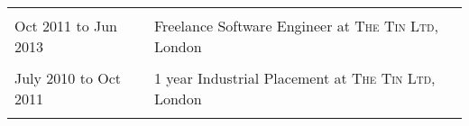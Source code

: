 \documentclass[a4paper,10pt]{article} %
\begin{document}
\begin{tabular}{ L{2cm} | L{11cm}}
    
 \\






Oct 2011 to Jun 2013 & Freelance Software Engineer at \textsc{The Tin Ltd}, London \\

 \\





July 2010 to Oct 2011 & 1 year Industrial Placement at \textsc{The Tin Ltd}, London \\


 \\



\end{tabular}
\end{document}
